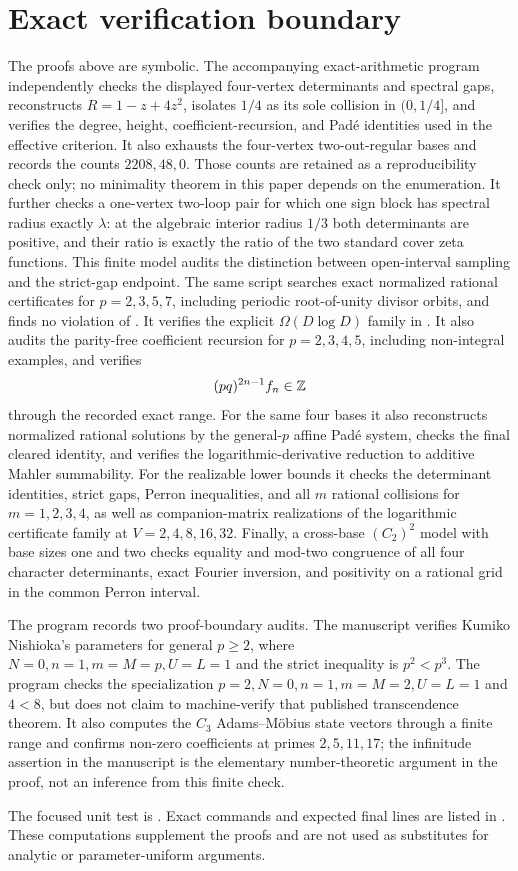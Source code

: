 \section{Exact verification boundary}
\label{sec:exactness}

The proofs above are symbolic.  The accompanying exact-arithmetic program
 independently checks the displayed
four-vertex determinants and spectral gaps, reconstructs
\(R=1-z+4z^2\), isolates \(1/4\) as its sole collision in
\((0,1/4]\), and verifies the degree, height, coefficient-recursion, and
Pad\'e identities used in the effective criterion.  It also exhausts the
four-vertex two-out-regular bases and records the counts \(2208,48,0\).
Those counts are retained as a reproducibility check only; no minimality
theorem in this paper depends on the enumeration.  It further checks a
one-vertex two-loop pair for which one sign block has
spectral radius exactly \(\lambda\): at the algebraic interior radius \(1/3\)
both determinants are positive, and their ratio is exactly the ratio of the
two standard cover zeta functions.  This finite model audits the distinction
between open-interval sampling and the strict-gap endpoint.
The same script searches exact normalized rational certificates for
\(p=2,3,5,7\), including periodic root-of-unity divisor orbits, and finds no
violation of .  It verifies the
explicit \(\Omega(D\log D)\) family in
.  It also audits the
parity-free coefficient recursion for \(p=2,3,4,5\), including non-integral
examples, and verifies
\[
 (pq)^{2n-1}f_n\in\mathbb{Z}
\]
through the recorded exact range.  For the same four bases it also reconstructs
normalized rational solutions by the general-\(p\) affine Pad\'e system,
checks the final cleared identity, and verifies the logarithmic-derivative
reduction to additive Mahler summability.  For the realizable lower bounds it checks
the determinant identities, strict gaps, Perron inequalities, and all
\(m\) rational collisions for \(m=1,2,3,4\), as well as companion-matrix
realizations of the logarithmic certificate family at
\(V=2,4,8,16,32\).  Finally, a cross-base
\((C_2)^2\) model with base sizes one and two checks equality and mod-two
congruence of all four character determinants, exact Fourier inversion, and
positivity on a rational grid in the common Perron interval.

The program records two proof-boundary audits.  The manuscript verifies
Kumiko Nishioka's parameters for general \(p\ge2\), where
\(N=0,n=1,m=M=p,U=L=1\) and the strict inequality is \(p^2<p^3\).
The program checks the specialization
\(p=2,N=0,n=1,m=M=2,U=L=1\) and \(4<8\), but does not claim to
machine-verify that published transcendence theorem.  It also computes the
\(C_3\) Adams--M\"obius state vectors through a
finite range and confirms non-zero coefficients at primes
\(2,5,11,17\); the infinitude assertion in the manuscript is the elementary
number-theoretic argument in the proof, not an inference from this finite
check.

The focused unit test is .  Exact
commands and expected final lines are listed in .  These
computations supplement the proofs and are not used as substitutes for
analytic or parameter-uniform arguments.
